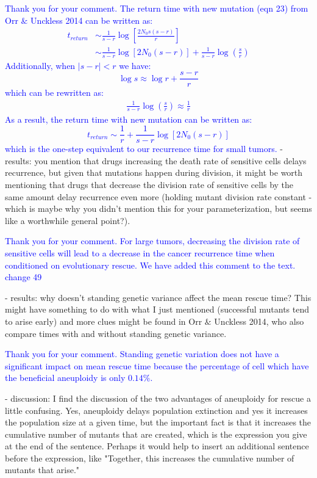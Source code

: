 \documentclass[11pt,a4paper]{article}
\begin{document}
\textcolor{blue}{Thank you for your comment. The return time with new mutation (eqn 23) from Orr $\&$ Unckless 2014 can be written as:
\begin{align*}
t_{return}&\sim\frac{1}{s-r}\log\left[\frac{2N_0s(s-r)}{r}\right]\\
&\sim \frac{1}{s-r}\log[2N_0(s-r)]+\frac{1}{s-r}\log\left(\frac{s}{r}\right)
\end{align*}
Additionally, when $|s-r|<r$ we have:
\begin{equation*}
\log s \approx \log r +\frac{s-r}{r}
\end{equation*}
which can be rewritten as:
\begin{align*}
\frac{1}{s-r}\log\left(\frac{s}{r}\right)\approx \frac{1}{r}
\end{align*}
As a result, the return time with new mutation can be written as:
\begin{equation*}
t_{return}\sim \frac{1}{r}+\frac{1}{s-r}\log[2N_0(s-r)]
\end{equation*}
which is the one-step equivalent to our recurrence time for small tumors.
} 
- results: you mention that drugs increasing the death rate of sensitive cells delays recurrence, but given that mutations happen during division, it might be worth mentioning that drugs that decrease the division rate of sensitive cells by the same amount delay recurrence even more (holding mutant division rate constant - which is maybe why you didn't mention this for your parameterization, but seems like a worthwhile general point?).

\textcolor{blue}{Thank you for your comment. For large tumors, decreasing the division rate of sensitive cells will lead to a decrease in the cancer recurrence time when conditioned on evolutionary rescue. We have added this comment to the text. change 49} 

- results: why doesn't standing genetic variance affect the mean rescue time? This might have something to do with what I just mentioned (successful mutants tend to arise early) and more clues might be found in Orr $\&$ Unckless 2014, who also compare times with and without standing genetic variance.

\textcolor{blue}{Thank you for your comment. Standing genetic variation does not have a significant impact on mean rescue time because the percentage of cell which have the beneficial aneuploidy is only $0.14\%$.} 

- discussion: I find the discussion of the two advantages of aneuploidy for rescue a little confusing. Yes, aneuploidy delays population extinction and yes it increases the population size at a given time, but the important fact is that it increases the cumulative number of mutants that are created, which is the expression you give at the end of the sentence. Perhaps it would help to insert an additional sentence before the expression, like "Together, this increases the cumulative number of mutants that arise."
\end{document}
